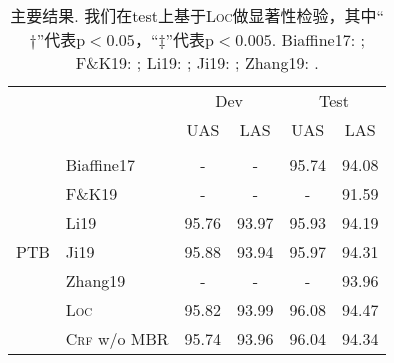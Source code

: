 \begin{table}[tb!]
  \centering
  \caption{主要结果. 我们在test上基于\textsc{Loc}做显著性检验，其中``$\dagger$''代表$\mathrm{p} < 0.05$，``$\ddagger$''代表$\mathrm{p} < 0.005$.
    Biaffine17: \cite{dozat-etal-2017-biaffine}; F\&K19: \cite{falenska-kuhn-2019-non};
    Li19: \cite{li-etal-2019-attentive}; Ji19: \cite{ji-etal-2019-graph};
    Zhang19: \cite{zhang-etal-2019-empirical}.
  }
  \begin{tabular}{llcccc}
    \toprule
                             &                        & \multicolumn{2}{c}{Dev} & \multicolumn{2}{c}{Test}                                                                       \\
                             &                        & UAS                     & LAS                      & UAS                              & LAS                              \\[2pt]
    \hline
    \\[-15pt]
    \multirow{10}{*}{PTB}    & Biaffine17             & -                       & -                        & 95.74                            & 94.08                            \\
                             & F\&K19                 & -                       & -                        & -                                & 91.59                            \\
                             & Li19                   & 95.76                   & 93.97                    & 95.93                            & 94.19                            \\
                             & Ji19                   & 95.88                   & 93.94                    & 95.97                            & 94.31                            \\
                             & Zhang19                & -                       & -                        & -                                & 93.96                            \\[3pt]
                             & \textsc{Loc}           & 95.82                   & 93.99                    & 96.08                            & 94.47                            \\
                             & \textsc{Crf} w/o MBR   & 95.74                   & 93.96                    & 96.04                            & 94.34                            \\

\end{tabular}
\end{table}
